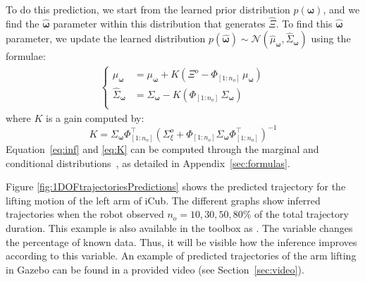 \documentclass[utf8]{frontiersSCNS} %
\newcommand{\todo}[1]{\textcolor{red}{\textbf{/*#1*/}}}
\begin{document}
To do this prediction, we start from the learned prior distribution $p(\boldsymbol{\omega})$, and we find the $\hat{\boldsymbol{\omega}}$ parameter within this distribution that generates $\hat{\Xi}$. To find this $\hat{\boldsymbol{\omega}}$ parameter, we update the learned distribution $p(\hat{\boldsymbol{\omega}}) \sim \mathcal{N}(\hat{\mu}_{\boldsymbol{\omega}},\hat{\Sigma}_{\boldsymbol{\omega}})$ using the formulae:
\begin{eqnarray} \label{eq:inf}
\left\{
\begin{array}{rl}
\hat{\mu}_{\boldsymbol{\omega}} &= \mu_{\boldsymbol{\omega}} + K(\Xi^o - \Phi_{[1:n_o]} \, \mu_{\boldsymbol{\omega}}) \\ 
\hat{\Sigma}_{\boldsymbol{\omega}} &= \Sigma_{\boldsymbol{\omega}} - K(\Phi_{[1:n_o]} \, \Sigma_{\boldsymbol{\omega}}) \\
\end{array}
\right.
\end{eqnarray}
where $K$ is a gain computed by:
\begin{equation}\label{eq:K}
K= \Sigma_{\boldsymbol{\omega}}\Phi_{[1:n_o]}^\top(\Sigma_\xi^o + \Phi_{[1:n_o]}\Sigma_{\boldsymbol{\omega}} \Phi_{[1:n_o]}^\top)^{-1}
\end{equation}
Equation~\ref{eq:inf} and \ref{eq:K} can be computed through the marginal and conditional distributions~\cite{paraschos2013probabilistic, Bishop:2006}, as detailed in Appendix~\ref{sec:formulas}.


Figure \ref{fig:1DOFtrajectoriesPredictions} shows the predicted trajectory for the lifting motion of the left arm of iCub. The different graphs show inferred trajectories when the robot observed $n_{o}=10,30,50,80\%$ of the total trajectory duration. This example is also available in the toolbox as . 
The  variable changes the percentage of known data. Thus, it will be visible how the inference improves according to this variable. An example of predicted trajectories of the arm lifting in Gazebo can be found in a provided video (see Section~\ref{sec:video}).


\end{document}
